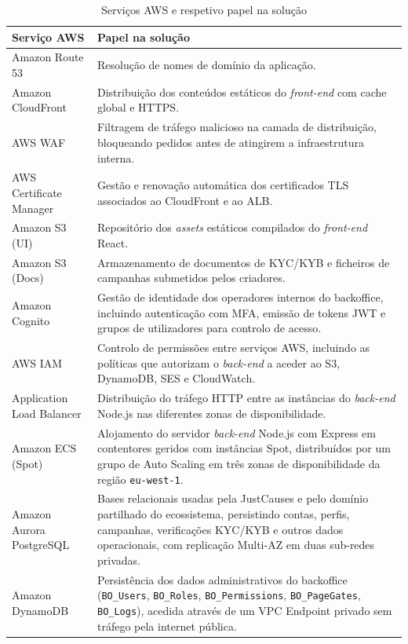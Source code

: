 \begin{table}[H]
\caption{Serviços AWS e respetivo papel na solução}
\label{tab:aws_servicos}
\begin{center}
\small
\begin{tabular}{|l|p{9cm}|}
\hline
Serviço AWS & Papel na solução \\ \hline
Amazon Route 53       & Resolução de nomes de domínio da aplicação. \\ \hline
Amazon CloudFront     & Distribuição dos conteúdos estáticos do \textit{front-end} com cache global e HTTPS. \\ \hline
AWS WAF               & Filtragem de tráfego malicioso na camada de distribuição, bloqueando pedidos antes de atingirem a infraestrutura interna. \\ \hline
AWS Certificate Manager & Gestão e renovação automática dos certificados TLS associados ao CloudFront e ao ALB. \\ \hline
Amazon S3 (UI)        & Repositório dos \textit{assets} estáticos compilados do \textit{front-end} React. \\ \hline
Amazon S3 (Docs)      & Armazenamento de documentos de \gls{KYC}/\gls{KYB} e ficheiros de campanhas submetidos pelos criadores. \\ \hline
Amazon Cognito        & Gestão de identidade dos operadores internos do backoffice, incluindo autenticação com MFA, emissão de tokens JWT e grupos de utilizadores para controlo de acesso. \\ \hline
AWS IAM               & Controlo de permissões entre serviços AWS, incluindo as políticas que autorizam o \textit{back-end} a aceder ao S3, DynamoDB, SES e CloudWatch. \\ \hline
Application Load Balancer & Distribuição do tráfego \gls{HTTP} entre as instâncias do \textit{back-end} Node.js nas diferentes zonas de disponibilidade. \\ \hline
Amazon ECS (Spot)     & Alojamento do servidor \textit{back-end} Node.js com Express em contentores geridos com instâncias Spot, distribuídos por um grupo de Auto Scaling em três zonas de disponibilidade da região \texttt{eu-west-1}. \\ \hline
Amazon Aurora PostgreSQL & Bases relacionais usadas pela JustCauses e pelo domínio partilhado do ecossistema, persistindo contas, perfis, campanhas, verificações \gls{KYC}/\gls{KYB} e outros dados operacionais, com replicação Multi-AZ em duas sub-redes privadas. \\ \hline
Amazon DynamoDB       & Persistência dos dados administrativos do backoffice (\texttt{BO\_Users}, \texttt{BO\_Roles}, \texttt{BO\_Permissions}, \texttt{BO\_PageGates}, \texttt{BO\_Logs}), acedida através de um VPC Endpoint privado sem tráfego pela internet pública. \\ \hline

\end{tabular}
\end{center}
\end{table}
